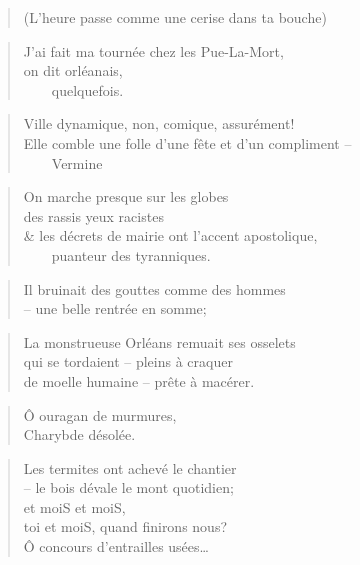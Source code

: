   \begin{verse}
    (L’heure passe comme une cerise dans ta bouche)
  \end{verse}
  \begin{verse}
    J’ai fait ma tournée chez les Pue-La-Mort,\\
    on dit orléanais,\\
    ~~~~quelquefois.
  \end{verse}
  \begin{verse}
    Ville dynamique, non, comique, assurément!\\
    Elle comble une folle d’une fête et d’un compliment --\\
    ~~~~Vermine
  \end{verse}
  \begin{verse}
    On marche presque sur les globes\\
    des rassis yeux racistes\\
    \& les décrets de mairie ont l’accent apostolique,\\
    ~~~~puanteur des tyranniques.
  \end{verse}
  \begin{verse}
    Il bruinait des gouttes comme des hommes\\
    -- une belle rentrée en somme;
  \end{verse}
  \begin{verse}
    La monstrueuse Orléans remuait ses osselets\\
    qui se tordaient -- pleins à craquer\\
    de moelle humaine -- prête à macérer.
  \end{verse}
  \begin{verse}
    Ô ouragan de murmures,\\
    Charybde désolée.
  \end{verse}
\newpage
{}
  \begin{verse}
    Les termites ont achevé le chantier\\
    -- le bois dévale le mont quotidien;\\
    et moiS et moiS,\\
    toi et moiS, quand finirons nous?\\
    Ô concours d’entrailles usées…
  \end{verse}
